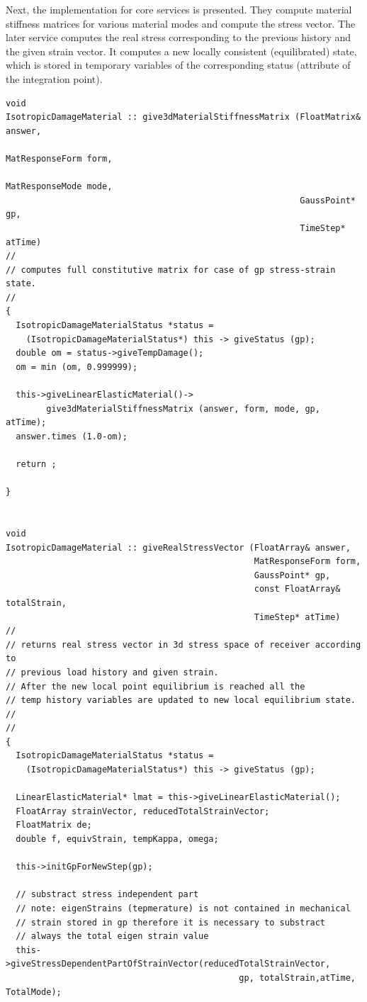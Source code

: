 \documentclass[a4paper]{article}
\begin{document}
Next, the implementation for core services is presented. They compute 
material stiffness matrices for various material modes and compute 
the stress vector. The later service computes the real stress
corresponding to the previous history and the given strain vector. It computes
a new locally consistent (equilibrated) state, which is stored in temporary
variables of the corresponding status (attribute of the integration point). 

{\small
\begin{verbatim}
void
IsotropicDamageMaterial :: give3dMaterialStiffnessMatrix (FloatMatrix& answer, 
                                                          MatResponseForm form,
                                                          MatResponseMode mode,
                                                          GaussPoint* gp,
                                                          TimeStep* atTime)
//
// computes full constitutive matrix for case of gp stress-strain state.
//
{
  IsotropicDamageMaterialStatus *status =
    (IsotropicDamageMaterialStatus*) this -> giveStatus (gp);
  double om = status->giveTempDamage();
  om = min (om, 0.999999);

  this->giveLinearElasticMaterial()->
        give3dMaterialStiffnessMatrix (answer, form, mode, gp, atTime);
  answer.times (1.0-om);

  return ;
  
}


void
IsotropicDamageMaterial :: giveRealStressVector (FloatArray& answer, 
                                                 MatResponseForm form, 
                                                 GaussPoint* gp, 
                                                 const FloatArray& totalStrain, 
                                                 TimeStep* atTime)
//
// returns real stress vector in 3d stress space of receiver according to 
// previous load history and given strain.
// After the new local point equilibrium is reached all the
// temp history variables are updated to new local equilibrium state.
// 
//
{
  IsotropicDamageMaterialStatus *status = 
    (IsotropicDamageMaterialStatus*) this -> giveStatus (gp);

  LinearElasticMaterial* lmat = this->giveLinearElasticMaterial();
  FloatArray strainVector, reducedTotalStrainVector;
  FloatMatrix de;
  double f, equivStrain, tempKappa, omega; 

  this->initGpForNewStep(gp);

  // substract stress independent part
  // note: eigenStrains (tepmerature) is not contained in mechanical
  // strain stored in gp therefore it is necessary to substract 
  // always the total eigen strain value
  this->giveStressDependentPartOfStrainVector(reducedTotalStrainVector,
                                              gp, totalStrain,atTime, TotalMode);


\end{verbatim}}
\end{document}
